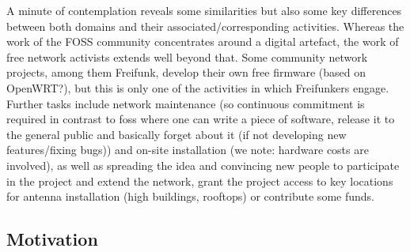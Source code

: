 A minute of contemplation reveals some similarities but also some key differences between both domains and their associated/corresponding activities.
Whereas the work of the FOSS community concentrates around a digital artefact, the work of free network activists extends well beyond that.
Some community network projects, among them Freifunk, develop their own free firmware (based on OpenWRT?), but this is only one of the activities in which Freifunkers engage.
Further tasks include network maintenance (so continuous commitment is required in contrast to foss where one can write a piece of software, release it to the general public and basically forget about it (if not developing new features/fixing bugs)) and on-site installation (we note: hardware costs are involved), as well as spreading the idea and convincing new people to participate in the project and extend the network, grant the project access to key locations for antenna installation (high buildings, rooftops) or contribute some funds.

\subsection{Motivation}

\begin{comment}
> To be motivated means to be moved to do something.

> Our own approach focuses primarily on psychological needs—namely,
> the innate needs for competence, autonomy, and relatedness
Ryan and Deci 2000

## *intrinsische* vs *extrinsische* Motivation

einfache Unterscheidung:
* intrinsisch: interessant/spannend/unterhaltsam an sich
* extrinsisch: führt zu einem bestimmten Ergebnis

aber
* Extrinsische Motivation != Extrinsische Motivation

Kontinuum:
~ Amotivation $\rightarrow$ External Regulation $\rightarrow$ Introjection $\rightarrow$ Identification $\rightarrow$ Integration $\rightarrow$ Intrinsic Motivation
~ $\rightarrow$ mit steigendem Gefühl für Autonomie und Kompetenz verinnerlicht man die Aufgabe und ist auch motivierter, diese zu erledigen
\end{comment}

\begin{comment}
What is FOSS (really brief, people should know that)
What is Freifunk (slightly less brief, is the new community) <--- that's the focus

Comparison of the domains:
* FOSS: digital products
* community networks:
  ** digital products (the firmware)
  ** hardware costs
  ** network maintanance
  ** network installation on site
  ** talk to people and convince them of the idea in order to
     *** get access to suitable locations
     *** get funds
     *** convince them to install their own routers and extend the network -- ``marketing'' aspect a way more pronounced

What types of motivation are relevant
\end{comment}
